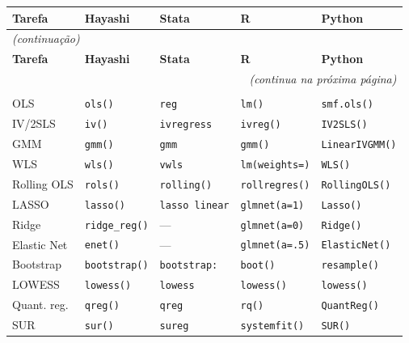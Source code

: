 {\footnotesize\setlength{\tabcolsep}{3pt}%
\begin{longtable}{lllll}
\toprule
\textbf{Tarefa} & \textbf{Hayashi} & \textbf{Stata} & \textbf{R} & \textbf{Python} \\
\midrule
\endfirsthead
\multicolumn{5}{l}{\footnotesize\itshape (continuação)} \\[2pt]
\toprule
\textbf{Tarefa} & \textbf{Hayashi} & \textbf{Stata} & \textbf{R} & \textbf{Python} \\
\midrule
\endhead
\midrule
\multicolumn{5}{r}{\footnotesize\itshape (continua na próxima página)} \\
\endfoot
\bottomrule
\endlastfoot
%
\multicolumn{5}{l}{\textit{Regressão}} \\
OLS             & \texttt{ols()}        & \texttt{reg}          & \texttt{lm()}          & \texttt{smf.ols()} \\
IV/2SLS         & \texttt{iv()}         & \texttt{ivregress}    & \texttt{ivreg()}       & \texttt{IV2SLS()} \\
GMM             & \texttt{gmm()}        & \texttt{gmm}          & \texttt{gmm()}         & \texttt{LinearIVGMM()} \\
WLS             & \texttt{wls()}        & \texttt{vwls}         & \texttt{lm(weights=)}  & \texttt{WLS()} \\
Rolling OLS     & \texttt{rols()}       & \texttt{rolling()}    & \texttt{rollregres()}  & \texttt{RollingOLS()} \\
LASSO           & \texttt{lasso()}      & \texttt{lasso linear} & \texttt{glmnet(a=1)}   & \texttt{Lasso()} \\
Ridge           & \texttt{ridge\_reg()} & —                     & \texttt{glmnet(a=0)}   & \texttt{Ridge()} \\
Elastic Net     & \texttt{enet()}       & —                     & \texttt{glmnet(a=.5)}  & \texttt{ElasticNet()} \\
Bootstrap       & \texttt{bootstrap()}  & \texttt{bootstrap:}   & \texttt{boot()}        & \texttt{resample()} \\
LOWESS          & \texttt{lowess()}     & \texttt{lowess}       & \texttt{lowess()}      & \texttt{lowess()} \\
Quant. reg.     & \texttt{qreg()}       & \texttt{qreg}         & \texttt{rq()}          & \texttt{QuantReg()} \\
SUR             & \texttt{sur()}        & \texttt{sureg}        & \texttt{systemfit()}   & \texttt{SUR()} \\
\midrule

\end{longtable}}
